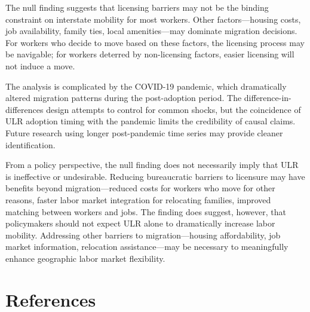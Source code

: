 \documentclass[12pt]{article}
\begin{document}
The null finding suggests that licensing barriers may not be the binding constraint on interstate mobility for most workers. Other factors---housing costs, job availability, family ties, local amenities---may dominate migration decisions. For workers who decide to move based on these factors, the licensing process may be navigable; for workers deterred by non-licensing factors, easier licensing will not induce a move.

The analysis is complicated by the COVID-19 pandemic, which dramatically altered migration patterns during the post-adoption period. The difference-in-differences design attempts to control for common shocks, but the coincidence of ULR adoption timing with the pandemic limits the credibility of causal claims. Future research using longer post-pandemic time series may provide cleaner identification.

From a policy perspective, the null finding does not necessarily imply that ULR is ineffective or undesirable. Reducing bureaucratic barriers to licensure may have benefits beyond migration---reduced costs for workers who move for other reasons, faster labor market integration for relocating families, improved matching between workers and jobs. The finding does suggest, however, that policymakers should not expect ULR alone to dramatically increase labor mobility. Addressing other barriers to migration---housing affordability, job market information, relocation assistance---may be necessary to meaningfully enhance geographic labor market flexibility.

\newpage

\section*{References}
\end{document}
